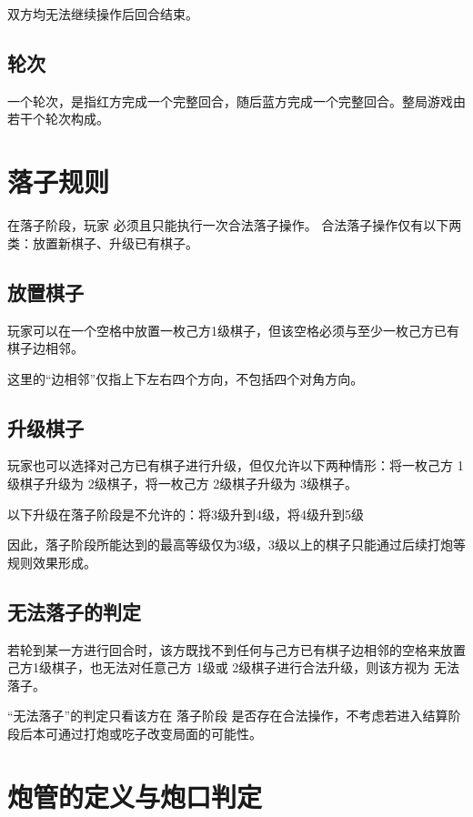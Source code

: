 \documentclass[12pt]{ctexart}
\begin{document}
双方均无法继续操作后回合结束。

\subsection{轮次}

一个轮次，是指红方完成一个完整回合，随后蓝方完成一个完整回合。整局游戏由若干个轮次构成。

\section{落子规则}

在落子阶段，玩家 必须且只能执行一次合法落子操作。
合法落子操作仅有以下两类：放置新棋子、升级已有棋子。

\subsection{放置棋子}

玩家可以在一个空格中放置一枚己方1级棋子，但该空格必须与至少一枚己方已有棋子边相邻。

这里的“边相邻”仅指上下左右四个方向，不包括四个对角方向。

\subsection{升级棋子}

玩家也可以选择对己方已有棋子进行升级，但仅允许以下两种情形：将一枚己方 1级棋子升级为 2级棋子，将一枚己方 2级棋子升级为 3级棋子。

以下升级在落子阶段是不允许的：将3级升到4级，将4级升到5级

因此，落子阶段所能达到的最高等级仅为3级，3级以上的棋子只能通过后续打炮等规则效果形成。

\subsection{无法落子的判定}

若轮到某一方进行回合时，该方既找不到任何与己方已有棋子边相邻的空格来放置己方1级棋子，也无法对任意己方 1级或 2级棋子进行合法升级，则该方视为 无法落子。

“无法落子”的判定只看该方在 落子阶段 是否存在合法操作，不考虑若进入结算阶段后本可通过打炮或吃子改变局面的可能性。

\section{炮管的定义与炮口判定}
\end{document}
